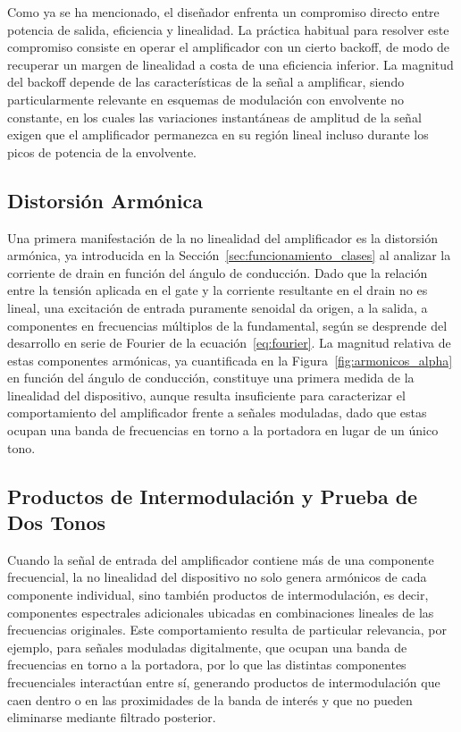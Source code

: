 Como ya se ha mencionado, el diseñador enfrenta un compromiso directo entre potencia de salida, eficiencia y linealidad. La práctica habitual para resolver este compromiso consiste en operar el amplificador con un cierto backoff, de modo de recuperar un margen de linealidad a costa de una eficiencia inferior. La magnitud del backoff depende de las características de la señal a amplificar, siendo particularmente relevante en esquemas de modulación con envolvente no constante, en los cuales las variaciones instantáneas de amplitud de la señal exigen que el amplificador permanezca en su región lineal incluso durante los picos de potencia de la envolvente.

\subsection{Distorsión Armónica}
Una primera manifestación de la no linealidad del amplificador es la distorsión armónica, ya introducida en la Sección~\ref{sec:funcionamiento_clases} al analizar la corriente de drain en función del ángulo de conducción. Dado que la relación entre la tensión aplicada en el gate y la corriente resultante en el drain no es lineal, una excitación de entrada puramente senoidal da origen, a la salida, a componentes en frecuencias múltiplos de la fundamental, según se desprende del desarrollo en serie de Fourier de la ecuación~\eqref{eq:fourier}. La magnitud relativa de estas componentes armónicas, ya cuantificada en la Figura~\ref{fig:armonicos_alpha} en función del ángulo de conducción, constituye una primera medida de la linealidad del dispositivo, aunque resulta insuficiente para caracterizar el comportamiento del amplificador frente a señales moduladas, dado que estas ocupan una banda de frecuencias en torno a la portadora en lugar de un único tono.

\subsection{Productos de Intermodulación y Prueba de Dos Tonos}
Cuando la señal de entrada del amplificador contiene más de una componente frecuencial, la no linealidad del dispositivo no solo genera armónicos de cada componente individual, sino también productos de intermodulación, es decir, componentes espectrales adicionales ubicadas en combinaciones lineales de las frecuencias originales. Este comportamiento resulta de particular relevancia, por ejemplo, para señales moduladas digitalmente, que ocupan una banda de frecuencias en torno a la portadora, por lo que las distintas componentes frecuenciales interactúan entre sí, generando productos de intermodulación que caen dentro o en las proximidades de la banda de interés y que no pueden eliminarse mediante filtrado posterior.

